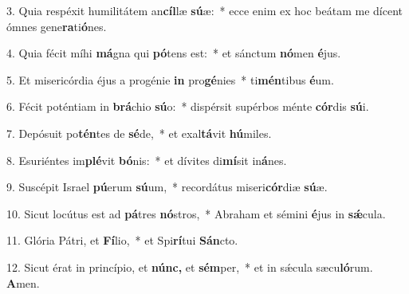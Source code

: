 \item 3. Quia respéxit humilitátem an\textbf{cíl}læ \textbf{sú}æ:~* ecce enim ex hoc beátam me dícent ómnes gene\textbf{ra}ti\textbf{ó}nes.

\item 4. Quia fécit míhi \textbf{má}gna qui \textbf{pó}tens est:~* et sánctum \textbf{nó}men \textbf{é}jus.

\item 5. Et misericórdia éjus a progénie \textbf{in} pro\textbf{gé}nies~* ti\textbf{mén}tibus \textbf{é}um.

\item 6. Fécit poténtiam in \textbf{brá}chio \textbf{sú}o:~* dispérsit supérbos ménte \textbf{cór}dis \textbf{sú}i.

\item 7. Depósuit po\textbf{tén}tes de \textbf{sé}de,~* et exal\textbf{tá}vit \textbf{hú}miles.

\item 8. Esuriéntes im\textbf{plé}vit \textbf{bó}nis:~* et dívites di\textbf{mí}sit in\textbf{á}nes.

\item 9. Suscépit Israel \textbf{pú}erum \textbf{sú}um,~* recordátus miseri\textbf{cór}diæ \textbf{sú}æ.

\item 10. Sicut locútus est ad \textbf{pá}tres \textbf{nó}stros,~* Abraham et sémini \textbf{é}jus in \textbf{sǽ}cula.

\item 11. Glória Pátri, et \textbf{Fí}lio,~* et Spi\textbf{rí}tui \textbf{Sán}cto.

\item 12. Sicut érat in princípio, et \textbf{núnc,} et \textbf{sém}per,~* et in sǽcula sæcu\textbf{ló}rum. \textbf{A}men.
